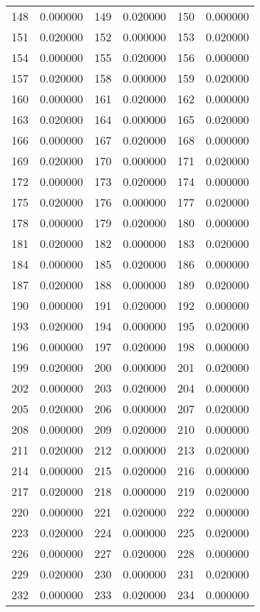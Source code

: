\documentclass[12pt]{article}
\begin{document}
\begin{longtable}{@{}cc|cc|cc@{}}
148 & 0.000000 & 149 & 0.020000 & 150 & 0.000000 \\
151 & 0.020000 & 152 & 0.000000 & 153 & 0.020000 \\
154 & 0.000000 & 155 & 0.020000 & 156 & 0.000000 \\
157 & 0.020000 & 158 & 0.000000 & 159 & 0.020000 \\
160 & 0.000000 & 161 & 0.020000 & 162 & 0.000000 \\
163 & 0.020000 & 164 & 0.000000 & 165 & 0.020000 \\
166 & 0.000000 & 167 & 0.020000 & 168 & 0.000000 \\
169 & 0.020000 & 170 & 0.000000 & 171 & 0.020000 \\
172 & 0.000000 & 173 & 0.020000 & 174 & 0.000000 \\
175 & 0.020000 & 176 & 0.000000 & 177 & 0.020000 \\
178 & 0.000000 & 179 & 0.020000 & 180 & 0.000000 \\
181 & 0.020000 & 182 & 0.000000 & 183 & 0.020000 \\
184 & 0.000000 & 185 & 0.020000 & 186 & 0.000000 \\
187 & 0.020000 & 188 & 0.000000 & 189 & 0.020000 \\
190 & 0.000000 & 191 & 0.020000 & 192 & 0.000000 \\
193 & 0.020000 & 194 & 0.000000 & 195 & 0.020000 \\
196 & 0.000000 & 197 & 0.020000 & 198 & 0.000000 \\
199 & 0.020000 & 200 & 0.000000 & 201 & 0.020000 \\
202 & 0.000000 & 203 & 0.020000 & 204 & 0.000000 \\
205 & 0.020000 & 206 & 0.000000 & 207 & 0.020000 \\
208 & 0.000000 & 209 & 0.020000 & 210 & 0.000000 \\
211 & 0.020000 & 212 & 0.000000 & 213 & 0.020000 \\
214 & 0.000000 & 215 & 0.020000 & 216 & 0.000000 \\
217 & 0.020000 & 218 & 0.000000 & 219 & 0.020000 \\
220 & 0.000000 & 221 & 0.020000 & 222 & 0.000000 \\
223 & 0.020000 & 224 & 0.000000 & 225 & 0.020000 \\
226 & 0.000000 & 227 & 0.020000 & 228 & 0.000000 \\
229 & 0.020000 & 230 & 0.000000 & 231 & 0.020000 \\
232 & 0.000000 & 233 & 0.020000 & 234 & 0.000000 \\

\end{longtable}
\end{document}
